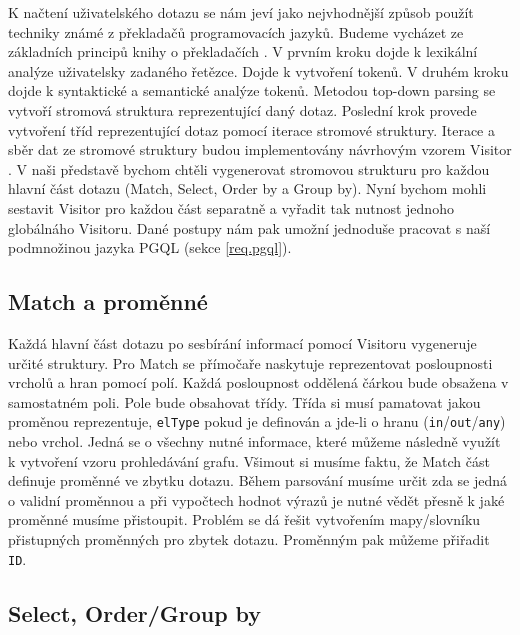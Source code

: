K načtení uživatelského dotazu se nám jeví jako nejvhodnější způsob použít techniky známé z překladačů programovacích jazyků.
Budeme vycházet ze základních principů knihy o překladačích \citep{dragoonBook}.
V prvním kroku dojde k lexikální analýze uživatelsky zadaného řetězce.
Dojde k vytvoření tokenů.
V druhém kroku dojde k syntaktické a semantické analýze tokenů.
Metodou top-down parsing \citep[str. 217]{dragoonBook} se vytvoří stromová struktura reprezentující daný dotaz.
Poslední krok provede vytvoření tříd reprezentující dotaz pomocí iterace stromové struktury.
Iterace a sběr dat ze stromové struktury budou implementovány návrhovým vzorem Visitor \citep[str. 331]{patterns}.
V naši představě bychom chtěli vygenerovat stromovou strukturu pro každou hlavní část dotazu (Match, Select, Order by a Group by).
Nyní bychom mohli sestavit Visitor pro každou část separatně a vyřadit tak nutnost jednoho globálnáho Visitoru.
Dané postupy nám pak umožní jednoduše pracovat s naší podmnožinou jazyka PGQL (sekce \ref{req.pgql}).


\subsection{Match a proměnné} \label{anal.mathcandvar}

Každá hlavní část dotazu po sesbírání informací pomocí Visitoru vygeneruje určité struktury.
Pro Match se přímočaře naskytuje reprezentovat posloupnosti vrcholů a hran pomocí polí.
Každá posloupnost oddělená čárkou bude obsažena v samostatném poli.
Pole bude obsahovat třídy.
Třída si musí pamatovat jakou proměnou reprezentuje, \verb+elType+ pokud je definován a jde-li o hranu (\texttt{in}/\texttt{out}/\texttt{any}) nebo vrchol.
Jedná se o všechny nutné informace, které můžeme následně využít k vytvoření vzoru prohledávání grafu.
Všimout si musíme faktu, že Match část definuje proměnné ve zbytku dotazu.
Během parsování musíme určit zda se jedná o validní proměnnou a při vypočtech hodnot výrazů je nutné vědět přesně k jaké proměnné musíme přistoupit.
Problém se dá řešit vytvořením mapy/slovníku přistupných proměnných pro zbytek dotazu.
Proměnným pak můžeme přiřadit \verb+ID+.

\subsection{Select, Order/Group by}


